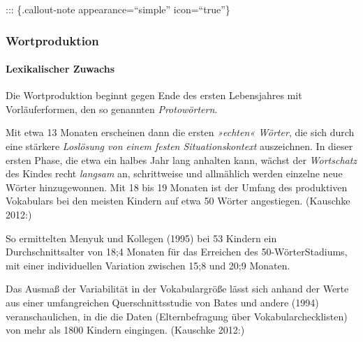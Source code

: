 \documentclass[
  letterpaper,
]{scrbook}
\let\oldparagraph\paragraph
\renewcommand{\paragraph}[1]{\oldparagraph{#1}\mbox{}}
\begin{document}
::: \{.callout-note appearance=``simple'' icon=``true''\}

\hypertarget{wortproduktion}{%
\subsubsection{Wortproduktion}\label{wortproduktion}}

\hypertarget{lexikalischer-zuwachs}{%
\paragraph{Lexikalischer Zuwachs}\label{lexikalischer-zuwachs}}

Die Wortproduktion beginnt gegen Ende des ersten Lebensjahres mit
Vorläuferformen, den so genannten \emph{Protowörtern}.

Mit etwa 13 Monaten erscheinen dann die ersten \emph{»echten« Wörter},
die sich durch eine stärkere \emph{Loslösung von einem festen
Situationskontext} auszeichnen. In dieser ersten Phase, die etwa ein
halbes Jahr lang anhalten kann, wächst der \emph{Wortschatz} des Kindes
recht \emph{langsam} an, schrittweise und allmählich werden einzelne
neue Wörter hinzugewonnen. Mit 18 bis 19 Monaten ist der Umfang des
produktiven Vokabulars bei den meisten Kindern auf etwa 50 Wörter
angestiegen. (Kauschke 2012:)

\begin{tcolorbox}[enhanced jigsaw, bottomrule=.15mm, colback=white, arc=.35mm, opacityback=0, colframe=quarto-callout-note-color-frame, rightrule=.15mm, leftrule=.75mm, breakable, toprule=.15mm, left=2mm]
\begin{minipage}[t]{5.5mm}
\textcolor{quarto-callout-note-color}{\faInfo}
\end{minipage}%
\begin{minipage}[t]{\textwidth - 5.5mm}

So ermittelten Menyuk und Kollegen (1995) bei 53 Kindern ein
Durchschnittsalter von 18;4 Monaten für das Erreichen des
50-WörterStadiums, mit einer individuellen Variation zwischen 15;8 und
20;9 Monaten.

\end{minipage}%
\end{tcolorbox}

Das Ausmaß der Variabilität in der Vokabulargröße lässt sich anhand der
Werte aus einer umfangreichen Querschnittsstudie von Bates und andere
(1994) veranschaulichen, in die die Daten (Elternbefragung über
Vokabularchecklisten) von mehr als 1800 Kindern eingingen. (Kauschke
2012:)
\end{document}
